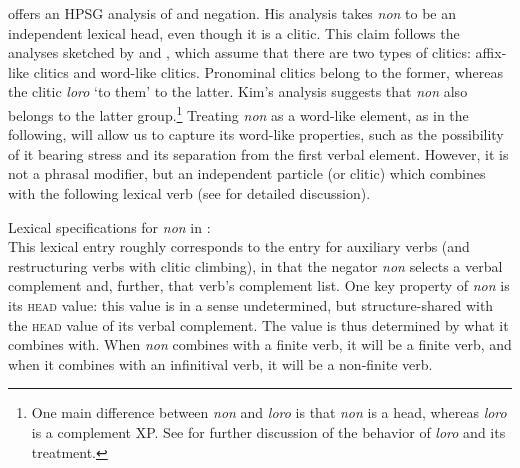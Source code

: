 \documentclass[output=paper
 	        ,biblatex
                ,babelshorthands
                ,newtxmath
                ,draftmode
                ,colorlinks, citecolor=brown
]{langscibook}
\begin{document}
\begin{exe}
\begin{xlist}
\citet{Kim:00} offers an HPSG analysis of  and  negation.
His analysis takes \textit{non}
to be an independent lexical head, even though it is a clitic.
This claim follows the  analyses sketched by \citet{Monachesi:93} and \citet{Monachesi:98},
which assume that there are two types of clitics: affix-like
clitics and word-like clitics. Pronominal clitics belong to the
former, whereas the clitic \textit{loro} `to them' to the
latter. Kim's analysis suggests that \textit{non} also belongs
to the latter group.\footnote{One main difference between
\textit{non} and \textit{loro} is that \textit{non} is a head, whereas \textit{loro} is a complement XP. See
\citet{Monachesi:98} for further discussion of the
behavior of \textit{loro} and its treatment.}
Treating \textit{non} as a word-like element, as in the following, will allow us to capture its word-like
properties, such as the possibility of it bearing stress and
its separation from the first verbal element. However, it is not a
phrasal modifier, but an independent particle (or clitic) which combines with
the following lexical  verb (see \citealt{Kim:00} for
detailed discussion).

\ea
\label{negation-non}
Lexical specifications for \textit{non} in :\\
\z
%
\noindent
This lexical entry roughly corresponds to the entry for
 auxiliary verbs (and restructuring verbs with clitic climbing),
in that the negator \textit{non} selects a verbal complement and, further, that verb's
complement list. One key property of \textit{non}
is its \textsc{head} value: this value is in a sense undetermined, but structure-shared with the \textsc{head} value of its verbal complement.
The value is thus
determined by what it combines with. When \textit{non} combines with a finite
verb, it will be a finite verb, and when it combines with an infinitival verb, it will be a
non-finite verb.


\end{xlist}
\end{exe}
\end{document}
